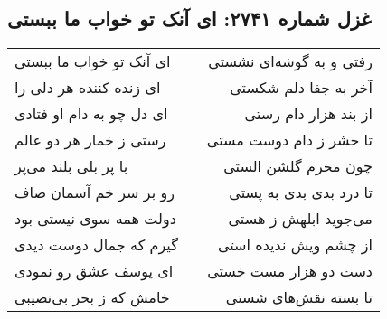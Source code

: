\begin{center}
\section*{غزل شماره ۲۷۴۱: ای آنک تو خواب ما ببستی}
\label{sec:2741}
\begin{longtable}{l p{0.5cm} r}
ای آنک تو خواب ما ببستی
&&
رفتی و به گوشه‌ای نشستی
\\
ای زنده کننده هر دلی را
&&
آخر به جفا دلم شکستی
\\
ای دل چو به دام او فتادی
&&
از بند هزار دام رستی
\\
رستی ز خمار هر دو عالم
&&
تا حشر ز دام دوست مستی
\\
با پر بلی بلند می‌پر
&&
چون محرم گلشن الستی
\\
رو بر سر خم آسمان صاف
&&
تا درد بدی بدی به پستی
\\
دولت همه سوی نیستی بود
&&
می‌جوید ابلهش ز هستی
\\
گیرم که جمال دوست دیدی
&&
از چشم ویش ندیده استی
\\
ای یوسف عشق رو نمودی
&&
دست دو هزار مست خستی
\\
خامش که ز بحر بی‌نصیبی
&&
تا بسته نقش‌های شستی
\\
\end{longtable}
\end{center}
